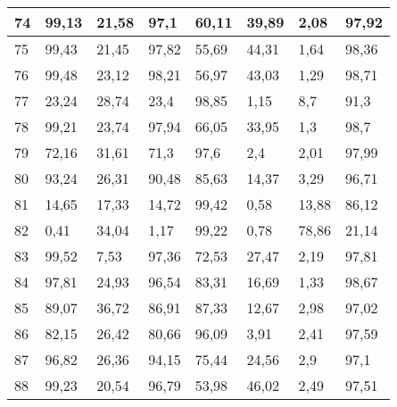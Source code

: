 \begin{longtable}[c]{|l|l|l|l|l|l|l|l|}
74              & 99,13        & 21,58        & 97,1        & 60,11         & 39,89         & 2,08          & 97,92         \\ \hline
75              & 99,43        & 21,45        & 97,82       & 55,69         & 44,31         & 1,64          & 98,36         \\ \hline
76              & 99,48        & 23,12        & 98,21       & 56,97         & 43,03         & 1,29          & 98,71         \\ \hline
77              & 23,24        & 28,74        & 23,4        & 98,85         & 1,15          & 8,7           & 91,3          \\ \hline
78              & 99,21        & 23,74        & 97,94       & 66,05         & 33,95         & 1,3           & 98,7          \\ \hline
79              & 72,16        & 31,61        & 71,3        & 97,6          & 2,4           & 2,01          & 97,99         \\ \hline
80              & 93,24        & 26,31        & 90,48       & 85,63         & 14,37         & 3,29          & 96,71         \\ \hline
81              & 14,65        & 17,33        & 14,72       & 99,42         & 0,58          & 13,88         & 86,12         \\ \hline
82              & 0,41         & 34,04        & 1,17        & 99,22         & 0,78          & 78,86         & 21,14         \\ \hline
83              & 99,52        & 7,53         & 97,36       & 72,53         & 27,47         & 2,19          & 97,81         \\ \hline
84              & 97,81        & 24,93        & 96,54       & 83,31         & 16,69         & 1,33          & 98,67         \\ \hline
85              & 89,07        & 36,72        & 86,91       & 87,33         & 12,67         & 2,98          & 97,02         \\ \hline
86              & 82,15        & 26,42        & 80,66       & 96,09         & 3,91          & 2,41          & 97,59         \\ \hline
87              & 96,82        & 26,36        & 94,15       & 75,44         & 24,56         & 2,9           & 97,1          \\ \hline
88              & 99,23        & 20,54        & 96,79       & 53,98         & 46,02         & 2,49          & 97,51         \\ \hline

\end{longtable}
